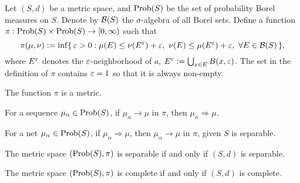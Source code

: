 \documentclass[a4paper]{article}
\begin{document}
\begin{thm}
Let $(S,d)$ be a metric space, and $\operatorname{Prob}(S)$ be the set of probability Borel measures on $S$.
Denote by $\mathcal{B}(S)$ the $\sigma$-algebra of all Borel sets.
Define a function $\pi:\operatorname{Prob}(S)\times\operatorname{Prob}(S)\to[0,\infty)$ such that
\[\pi(\mu,\nu):=\inf\{\,\e>0:\mu(E)\le\nu(E^\e)+\e,\ \nu(E)\le\mu(E^\e)+\e,\ \forall E\in\cB(S)\,\},\]
where $E^\varepsilon$ denotes the $\varepsilon$-neighborhood of $a$, $E^\varepsilon:=\bigcup_{x\in E}B(x,\varepsilon)$.
The set in the definition of $\pi$ contains $\varepsilon=1$ so that it is always non-empty.
\begin{parts}
\item The function $\pi$ is a metric.
\item For a sequence $\mu_n\in\operatorname{Prob}(S)$, if $\mu_n\to\mu$ in $\pi$, then $\mu_n\Rightarrow\mu$.
\item For a net $\mu_\alpha\in\operatorname{Prob}(S)$, if $\mu_\alpha\Rightarrow\mu$, then $\mu_\alpha\to\mu$ in $\pi$, given $S$ is separable.
\item The metric space $(\operatorname{Prob}(S),\pi)$ is separable if and only if $(S,d)$ is separable.
\item The metric space $(\operatorname{Prob}(S),\pi)$ is complete if and only if $(S,d)$ is complete.
\end{parts}
\end{thm}
\end{document}
